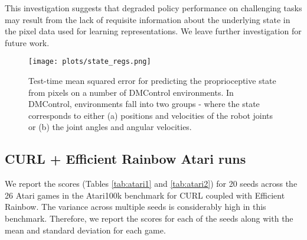 \documentclass{article}
\begin{document}
This investigation suggests that degraded policy performance on challenging tasks may result from the lack of requisite information about the underlying state in the pixel data used for learning representations. We leave further investigation for future work.

\begin{figure}[!ht]
\begin{center}
\centerline{\texttt{[image: plots/state\_regs.png]}}
\caption{Test-time mean squared error for predicting the proprioceptive state from pixels on a number of DMControl environments. In DMControl, environments fall into two groups - where the state corresponds to either (a) positions and velocities of the robot joints or (b) the joint angles and angular velocities.}
   \label{fig:statereg}
\end{center}
\vskip -0.2in
\end{figure}

\subsection{CURL + Efficient Rainbow Atari runs}

We report the scores (Tables \ref{tab:atari1} and \ref{tab:atari2}) for 20 seeds across the 26 Atari games in the Atari100k benchmark for CURL coupled with Efficient Rainbow. The variance across multiple seeds is considerably high in this benchmark. Therefore, we report the scores for each of the seeds along with the mean and standard deviation for each game. 
\end{document}
